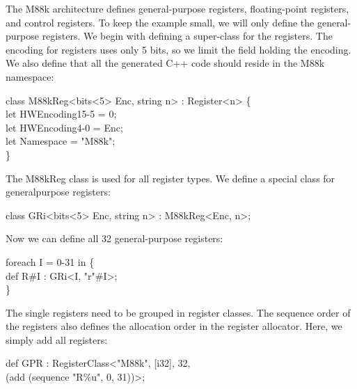 The M88k architecture defines general-purpose registers, floating-point registers, and control registers. To keep the example small, we will only define the general-purpose registers. We begin with defining a super-class for the registers. The encoding for registers uses only 5 bits, so we limit the field holding the encoding. We also define that all the generated C++ code should reside in the M88k namespace:\par

\begin{tcolorbox}[colback=white,colframe=black]
class M88kReg<bits<5> Enc, string n> : Register<n> \{ \\
\hspace*{1cm}let HWEncoding{15-5} = 0; \\
\hspace*{1cm}let HWEncoding{4-0} = Enc; \\
\hspace*{1cm}let Namespace = "M88k"; \\
\}
\end{tcolorbox}

The M88kReg class is used for all register types. We define a special class for generalpurpose registers:\par

\begin{tcolorbox}[colback=white,colframe=black]
class GRi<bits<5> Enc, string n> : M88kReg<Enc, n>;
\end{tcolorbox}

Now we can define all 32 general-purpose registers:\par

\begin{tcolorbox}[colback=white,colframe=black]
foreach I = 0-31 in \{ \\
\hspace*{1cm}def R\#I : GRi<I, "r"\#I>; \\
\}
\end{tcolorbox}

The single registers need to be grouped in register classes. The sequence order of the registers also defines the allocation order in the register allocator. Here, we simply add all registers:\par

\begin{tcolorbox}[colback=white,colframe=black]
def GPR : RegisterClass<"M88k", [i32], 32, \\
\hspace*{4.5cm}(add (sequence "R\%u", 0, 31))>;
\end{tcolorbox}

